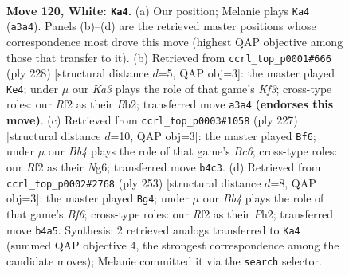 \documentclass[11pt]{article}
\begin{document}
\clearpage

\begin{figure}[p]\centering
\begin{subfigure}{0.46\textwidth}\centering
\resizebox{\linewidth}{!}{%
\newchessgame
\chessboard[
  setfen={6k1/8/7r/8/1B6/K7/5R2/8 w - - 7 120},
  showmover=false,
  pgfstyle=straightmove, color=movearrow, markmove={a3-a4}
]}
\caption{}
\end{subfigure}\hfill
\begin{subfigure}{0.46\textwidth}\centering
\resizebox{\linewidth}{!}{%
\newchessgame
\chessboard[
  setfen={8/8/8/2k5/8/5K2/1B2B3/8 w - - 7 115},
  showmover=false,
  pgfstyle=straightmove, color=movearrow, markmove={f3-e4}
]}
\caption{}
\end{subfigure}
\\[4pt]
\begin{subfigure}{0.46\textwidth}\centering
\resizebox{\linewidth}{!}{%
\newchessgame
\chessboard[
  setfen={8/2R5/6n1/3K4/6B1/2b5/1k6/8 b - - 68 114},
  showmover=false,
  pgfstyle=straightmove, color=movearrow, markmove={c3-f6}
]}
\caption{}
\end{subfigure}\hfill
\begin{subfigure}{0.46\textwidth}\centering
\resizebox{\linewidth}{!}{%
\newchessgame
\chessboard[
  setfen={7R/8/8/8/8/5b2/6kp/4K3 b - - 1 127},
  showmover=false,
  pgfstyle=straightmove, color=movearrow, markmove={f3-g4}
]}
\caption{}
\end{subfigure}
\caption{\textbf{Move 120, White: \texttt{Ka4}.} (a) Our position; Melanie plays \texttt{Ka4} (\texttt{a3a4}). Panels (b)--(d) are the retrieved master positions whose correspondence most drove this move (highest QAP objective among those that transfer to it). (b) Retrieved from \texttt{ccrl\_top\_p0001\#666} (ply 228) [structural distance $d$=5, QAP obj=3]: the master played \texttt{Ke4}; under $\mu$ our \emph{Ka3} plays the role of that game's \emph{Kf3}; cross-type roles: our \emph{R}f2 as their \emph{B}b2; transferred move \texttt{a3a4} \textbf{(endorses this move)}. (c) Retrieved from \texttt{ccrl\_top\_p0003\#1058} (ply 227) [structural distance $d$=10, QAP obj=3]: the master played \texttt{Bf6}; under $\mu$ our \emph{Bb4} plays the role of that game's \emph{Bc6}; cross-type roles: our \emph{R}f2 as their \emph{N}g6; transferred move \texttt{b4c3}. (d) Retrieved from \texttt{ccrl\_top\_p0002\#2768} (ply 253) [structural distance $d$=8, QAP obj=3]: the master played \texttt{Bg4}; under $\mu$ our \emph{Bb4} plays the role of that game's \emph{Bf6}; cross-type roles: our \emph{R}f2 as their \emph{P}h2; transferred move \texttt{b4a5}. Synthesis: 2 retrieved analogs transferred to \texttt{Ka4} (summed QAP objective 4, the strongest correspondence among the candidate moves); Melanie committed it via the \texttt{search} selector.}
\label{fig:thought-m238}
\end{figure}
\end{document}
